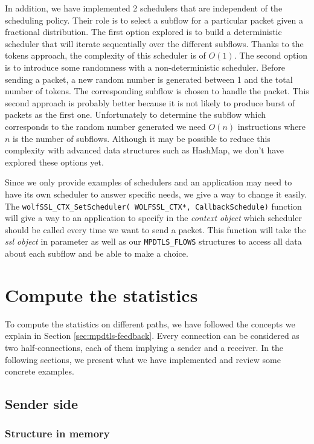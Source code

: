 In addition, we have implemented 2 schedulers that are independent of the scheduling policy. Their role is to select a subflow for a particular packet given a fractional distribution. The first option explored is to build a deterministic scheduler that will iterate sequentially over the different subflows. Thanks to the tokens approach, the complexity of this scheduler is of $O(1)$. The second option is to introduce some randomness with a non-deterministic scheduler. Before sending a packet, a new random number is generated between 1 and the total number of tokens. The corresponding subflow is chosen to handle the packet. This second approach is probably better because it is not likely to produce burst of packets as the first one. Unfortunately to determine the subflow which corresponds to the random number generated we need $O(n)$ instructions where $n$ is the number of subflows. Although it may be possible to reduce this complexity with advanced data structures such as HashMap, we don't have explored these options yet.

Since we only provide examples of schedulers and an application may need to have its own scheduler to answer specific needs, we give a way to change it easily. The \texttt{wolfSSL\_CTX\_SetScheduler( WOLFSSL\_CTX*, CallbackSchedule)} function will give a way to an application to specify in the \textit{context object} which scheduler should be called every time we want to send a packet. This function will take the \textit{ssl object} in parameter as well as our \texttt{MPDTLS\_FLOWS} structures to access all data about each subflow and be able to make a choice.

\section{Compute the statistics}\label{sec:impl-stats}

To compute the statistics on different paths, we have followed the concepts we explain in Section \ref{sec:mpdtls-feedback}. Every connection can be considered as two half-connections, each of them implying a sender and a receiver. In the following sections, we present what we have implemented and review some concrete examples. 

\subsection{Sender side}

\subsubsection{Structure in memory}

